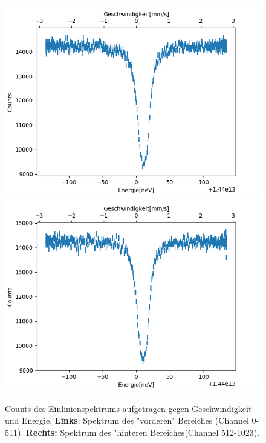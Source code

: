 \documentclass[12pt,a4paper]{article}
\begin{document}
\begin{figure}
\centering
\includegraphics[scale=0.5]{Bilder/Einlinien/Ein_Data_vor.png}
\includegraphics[scale=0.5]{Bilder/Einlinien/Ein_Data_nach.png}
\caption{Counts des Einlinienspektrums aufgetragen gegen Geschwindigkeit und Energie. \textbf{Links}: Spektrum des "vorderen" Bereiches (Channel 0-511). \textbf{Rechts:} Spektrum des "hinteren Bereiches(Channel 512-1023).}
\label{fig:Ein_Data}
\end{figure}
\end{document}
